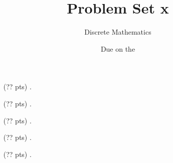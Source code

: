 

\title{Problem Set x}
\author[Daniel Gonzalez Cedre]{Discrete Mathematics}
\date{Due on the }



\maketitle

\begin{enumerate}
  \item[(?? pts) \quad 1.]

  \item[(?? pts) \quad 2.]

  \item[(?? pts) \quad 3.]

  \item[(?? pts) \quad 4.]

  \item[(?? pts) \quad 5.]

\end{enumerate}



